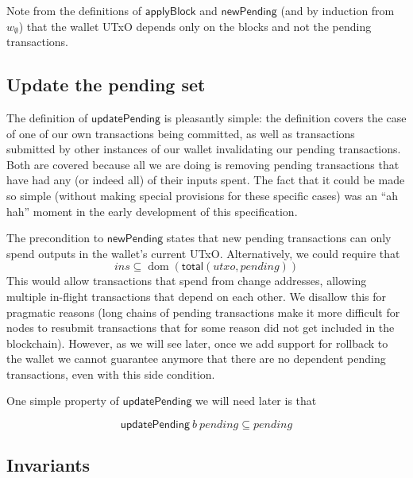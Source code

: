 \documentclass{article}
\DeclareMathOperator{\dom}{dom}
\theoremstyle{definition}{
  \newtheorem{lemma}{Lemma}[section] %
  \newtheorem{definition}[lemma]{Definition}
}
\theoremstyle{theorem}{
  \newtheorem{invariant}[lemma]{Invariant}
  \newtheorem{proofobligation}[lemma]{Proof Obligation}
}
\numberwithin{equation}{lemma}
\begin{document}
Note from the definitions of $\mathsf{applyBlock}$ and $\mathsf{newPending}$
(and by induction from $w_\emptyset$) that the wallet UTxO depends only on the
blocks and not the pending transactions.

\subsection{Update the pending set}
\label{sec:updatePending}

The definition of $\mathsf{updatePending}$ is pleasantly simple: the definition
covers the case of one of our own transactions being committed, as well as
transactions submitted by other instances of our wallet invalidating our pending
transactions. Both are covered because all we are doing is removing pending
transactions that have had any (or indeed all) of their inputs spent. The fact
that it could be made so simple (without making special provisions for these
specific cases) was an ``ah hah'' moment in the early development of this
specification.

The precondition to $\mathsf{newPending}$ states that new pending transactions
can only spend outputs in the wallet's current UTxO. Alternatively, we could
require that
%
\begin{equation*}
\mathit{ins} \subseteq \dom (\mathsf{total}(\mathit{utxo}, \mathit{pending}))
\end{equation*}
%
This would allow transactions that spend from change addresses, allowing
multiple in-flight transactions that depend on each other. We disallow this
for pragmatic reasons (long chains of pending transactions make it more
difficult for nodes to resubmit transactions that for some reason did not
get included in the blockchain). However, as we will see later, once
we add support for rollback to the wallet we cannot guarantee anymore that
there are no dependent pending transactions, even with this side condition.

One simple property of $\mathsf{updatePending}$ we will need later is that
%
\begin{lemma} \label{lem:updatePending_is_filter}
\begin{equation*}
\mathsf{updatePending} ~ b ~ \mathit{pending} \subseteq \mathit{pending}
\end{equation*}
\end{lemma}

\subsection{Invariants}
\label{sec:invariants}
\end{document}
